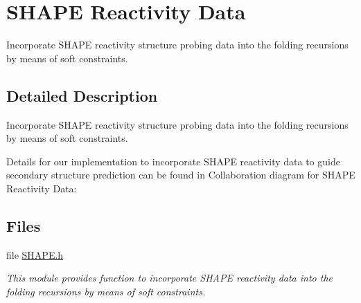 \hypertarget{group__SHAPE__reactivities}{}\section{S\+H\+A\+PE Reactivity Data}
\label{group__SHAPE__reactivities}


Incorporate S\+H\+A\+PE reactivity structure probing data into the folding recursions by means of soft constraints.  




\subsection{Detailed Description}
Incorporate S\+H\+A\+PE reactivity structure probing data into the folding recursions by means of soft constraints. 

Details for our implementation to incorporate S\+H\+A\+PE reactivity data to guide secondary structure prediction can be found in \cite{lorenz:2016a} Collaboration diagram for S\+H\+A\+PE Reactivity Data\+:
\subsection*{Files}
\begin{DoxyCompactItemize}
\item 
file \mbox{\hyperlink{SHAPE_8h}{S\+H\+A\+P\+E.\+h}}
\begin{DoxyCompactList}\small\item\em This module provides function to incorporate S\+H\+A\+PE reactivity data into the folding recursions by means of soft constraints. \end{DoxyCompactList}\end{DoxyCompactItemize}
